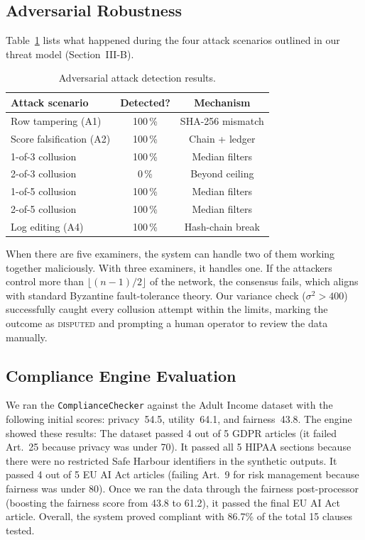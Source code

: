 \subsection{Adversarial Robustness}

Table~\ref{tab:attack} lists what happened during the four attack scenarios outlined in our threat model (Section~III-B).

\begin{table}[h]
\centering
\caption{Adversarial attack detection results.}
\label{tab:attack}
\begin{tabular}{lcc}
\toprule
\textbf{Attack scenario} & \textbf{Detected?} & \textbf{Mechanism} \\
\midrule
Row tampering (A1) & 100\,\% & SHA-256 mismatch \\
Score falsification (A2) & 100\,\% & Chain + ledger \\
1-of-3 collusion & 100\,\% & Median filters \\
2-of-3 collusion & 0\,\% & Beyond ceiling \\
1-of-5 collusion & 100\,\% & Median filters \\
2-of-5 collusion & 100\,\% & Median filters \\
Log editing (A4) & 100\,\% & Hash-chain break \\
\bottomrule
\end{tabular}
\end{table}

When there are five examiners, the system can handle two of them working together maliciously. With three examiners, it handles one. If the attackers control more than $\lfloor(n{-}1)/2\rfloor$ of the network, the consensus fails, which aligns with standard Byzantine fault-tolerance theory. Our variance check ($\sigma^2>400$) successfully caught every collusion attempt within the limits, marking the outcome as \textsc{disputed} and prompting a human operator to review the data manually.

\subsection{Compliance Engine Evaluation}

We ran the \texttt{ComplianceChecker} against the Adult Income dataset with the following initial scores: privacy~54.5, utility~64.1, and fairness~43.8. The engine showed these results: The dataset passed 4 out of 5 GDPR articles (it failed Art.~25 because privacy was under 70). It passed all 5 HIPAA sections because there were no restricted Safe Harbour identifiers in the synthetic outputs. It passed 4 out of 5 EU AI Act articles (failing Art.~9 for risk management because fairness was under 80). Once we ran the data through the fairness post-processor (boosting the fairness score from 43.8 to 61.2), it passed the final EU AI Act article. Overall, the system proved compliant with 86.7\% of the total 15 clauses tested.

